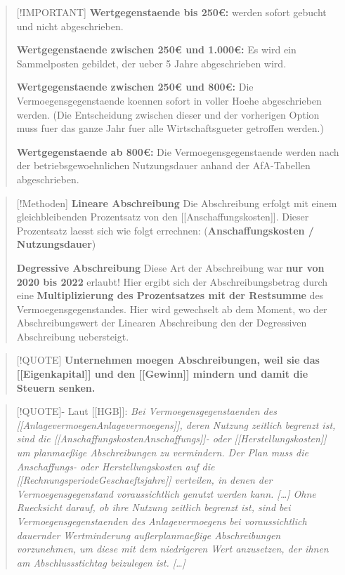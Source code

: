 \begin{quote}
{[}!IMPORTANT{]} \textbf{Wertgegenstaende bis 250€:} werden sofort
gebucht und nicht abgeschrieben.

\textbf{Wertgegenstaende zwischen 250€ und 1.000€:} Es wird ein
Sammelposten gebildet, der ueber 5 Jahre abgeschrieben wird.

\textbf{Wertgegenstaende zwischen 250€ und 800€:} Die
Vermoegensgegenstaende koennen sofort in voller Hoehe abgeschrieben werden.
(Die Entscheidung zwischen dieser und der vorherigen Option muss fuer das
ganze Jahr fuer alle Wirtschaftsgueter getroffen werden.)

\textbf{Wertgegenstaende ab 800€:} Die Vermoegensgegenstaende werden nach
der betriebsgewoehnlichen Nutzungsdauer anhand der AfA-Tabellen
abgeschrieben.
\end{quote}

\begin{quote}
{[}!Methoden{]} \textbf{Lineare Abschreibung} Die Abschreibung erfolgt
mit einem gleichbleibenden Prozentsatz von den
{[}{[}Anschaffungskosten{]}{]}. Dieser Prozentsatz laesst sich wie folgt
errechnen: (\textbf{Anschaffungskosten / Nutzungsdauer})

\textbf{Degressive Abschreibung} Diese Art der Abschreibung war
\textbf{nur von 2020 bis 2022} erlaubt! Hier ergibt sich der
Abschreibungsbetrag durch eine \textbf{Multiplizierung des Prozentsatzes
mit der Restsumme} des Vermoegensgegenstandes. Hier wird gewechselt ab
dem Moment, wo der Abschreibungswert der Linearen Abschreibung den der
Degressiven Abschreibung uebersteigt.
\end{quote}

\begin{quote}
{[}!QUOTE{]} \textbf{Unternehmen moegen Abschreibungen, weil sie das
{[}{[}Eigenkapital{]}{]} und den {[}{[}Gewinn{]}{]} mindern und damit
die Steuern senken.}
\end{quote}

\begin{quote}
{[}!QUOTE{]}- Laut {[}{[}HGB{]}{]}: \emph{Bei Vermoegensgegenstaenden des
{[}{[}Anlagevermoegen\textbar Anlagevermoegens{]}{]}, deren Nutzung
zeitlich begrenzt ist, sind die
{[}{[}Anschaffungskosten\textbar Anschaffungs{]}{]}- oder
{[}{[}Herstellungskosten{]}{]} um planmaeßige Abschreibungen zu
vermindern. Der Plan muss die Anschaffungs- oder Herstellungskosten auf
die {[}{[}Rechnungsperiode\textbar Geschaeftsjahre{]}{]} verteilen, in
denen der Vermoegensgegenstand voraussichtlich genutzt werden kann.
{[}\ldots{]} Ohne Ruecksicht darauf, ob ihre Nutzung zeitlich begrenzt
ist, sind bei Vermoegensgegenstaenden des Anlagevermoegens bei
voraussichtlich dauernder Wertminderung außerplanmaeßige Abschreibungen
vorzunehmen, um diese mit dem niedrigeren Wert anzusetzen, der ihnen am
Abschlussstichtag beizulegen ist. {[}\ldots{]}}
\end{quote}

